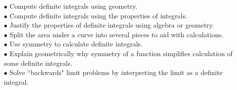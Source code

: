 \documentclass{ximera}
\begin{document}
\noindent$\bullet$ Compute definite integrals using geometry.
\\$\bullet$ Compute definite integrals using the properties of integrals.
\\$\bullet$ Justify the properties of definite integrals using algebra or geometry.
\\$\bullet$ Split the area under a curve into several pieces to aid with calculations.
\\$\bullet$ Use symmetry to calculate definite integrals.
\\$\bullet$ Explain geometrically why symmetry of a function simplifies calculation of some definite integrals.
\\$\bullet$ Solve ``backwards" limit problems by interpreting the limit as a definite integral.
\end{document}
